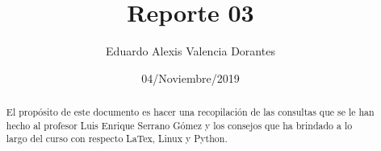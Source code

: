 \documentclass[letter,12pt]{article}
\title{Reporte 03}
\author{Eduardo Alexis Valencia Dorantes}
\date{04/Noviembre/2019}
\begin{document}
	

\begin{abstract}
	El propósito de este documento es hacer una recopilación de las consultas que se le han hecho al profesor Luis Enrique Serrano Gómez y los consejos que ha brindado a lo largo del curso con respecto LaTex, Linux y Python. 
\end{abstract}
\end{document}
